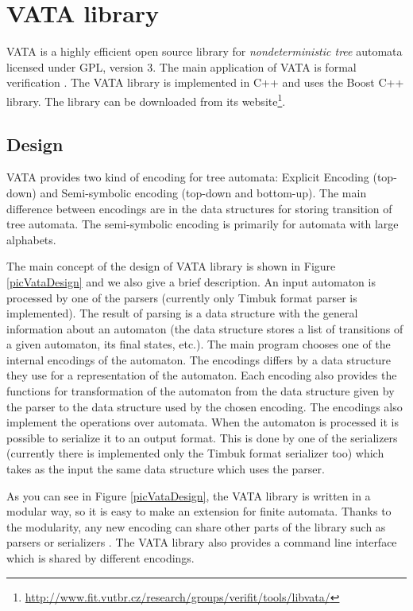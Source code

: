 \section{VATA library}
\label{VATA}
VATA is a highly efficient open source library for \emph{nondeterministic tree} automata licensed under GPL, version 3. 
The main application of VATA is formal verification \cite{libvata}.
The VATA library is implemented in C++ and uses the Boost C++ library. 
The library can be downloaded from its website\footnote{\url{http://www.fit.vutbr.cz/research/groups/verifit/tools/libvata/}}.  

\subsection{Design}
\label{sectionDesignVata}
VATA provides two kind of encoding for tree automata: Explicit Encoding (top-down) and Semi-symbolic encoding (top-down and bottom-up). The main difference
between encodings are
in the data structures for storing transition of tree automata. The semi-symbolic encoding is primarily for automata with large alphabets. 

The main concept of the design of VATA library is shown in Figure \ref{picVataDesign} and we also give a brief description. 
An input automaton is processed by one of the parsers (currently
only Timbuk format parser is implemented). The result of parsing is a data structure with the general information about an automaton 
(the data structure stores a list
of transitions of a given automaton, its final states, etc.). The main program chooses one of the internal encodings of the automaton. The encodings
differs by a data structure they use for a representation of the automaton. Each encoding also provides the functions for transformation of the automaton 
from the data structure given by the parser to the data structure used by the chosen encoding. The encodings also implement
the operations over automata. When the automaton is processed it is possible to serialize it to an output format. 
This is done by one of the serializers (currently there is implemented only the Timbuk format serializer too) 
which takes as the input the same data structure which uses the parser.

As you can see in Figure \ref{picVataDesign}, the VATA library is written in a modular way, so it is easy to make an extension for finite automata. 
Thanks to the modularity, any new encoding can share other parts of the library such as parsers or serializers \cite{libvata}. 
The VATA library also provides a command line interface which is shared by different encodings.

